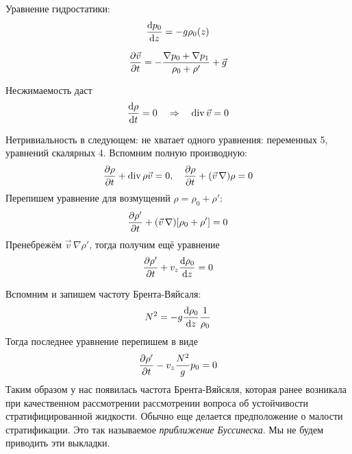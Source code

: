 Уравнение гидростатики:
\begin{equation}
    \dv{p_0}{z} = -g \rho_0(z)
\end{equation}

\begin{equation}
    \pdv{\vec{v}}{t} = -\frac{\nabla p_0+\nabla p_1}{\rho_0+\rho'}+\vec{g}
\end{equation}

Несжимаемость даст
\begin{equation}
    \dv{\rho}{t} = 0 \quad \Rightarrow \quad
    \operatorname{div} \vec{v} = 0
\end{equation}

Нетривиальность в следующем: не хватает одного уравнения: переменных 5, уравнений скалярных 4.
Вспомним полную производную:
\begin{equation}
    \pdv{\rho}{t}+\operatorname{div} \rho \vec{v} = 0, \quad
    \pdv{\rho}{t}+(\vec{v}\,\nabla)\rho = 0
\end{equation}
Перепишем уравнение для возмущений $\rho = \rho_0+\rho'$:
\begin{equation}
    \pdv{\rho'}{t}+(\vec{v}\,\nabla)[\rho_0+\rho'] = 0
\end{equation}
Пренебрежём $\vec{v}\,\nabla \rho'$, тогда получим ещё уравнение
\begin{equation}
    \pdv{\rho'}{t}+v_z\dv{\rho_0}{z} = 0
\end{equation}

Вспомним и запишем частоту Брента-Вяйсаля:
\begin{equation}
    N^2 = -g\dv{\rho_0}{z}\frac{1}{\rho_0}
\end{equation}
Тогда последнее уравнение перепишем в виде
\begin{equation}
    \pdv{\rho'}{t}-v_z \frac{N^2}{g}p_0 = 0
\end{equation}
Таким образом у нас появилась частота Брента-Вяйсяля, которая ранее возникала при качественном рассмотрении рассмотрении вопроса об устойчивости стратифицированной жидкости. Обычно еще делается предположение о малости стратификации. Это так называемое \textit{приближение Буссинеска}.  Мы не будем приводить эти выкладки.

